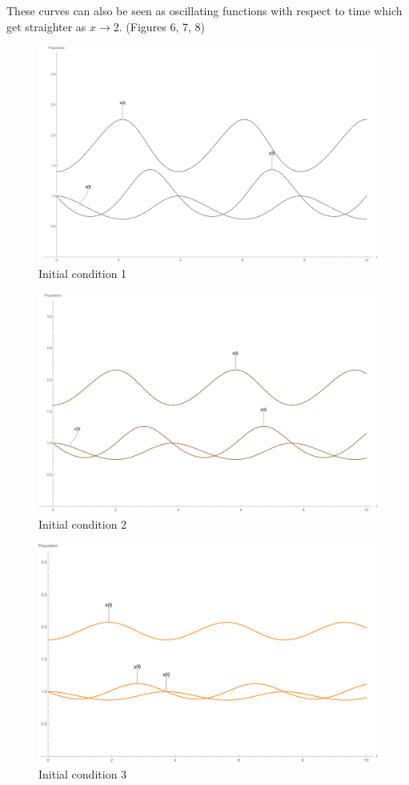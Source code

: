 \documentclass[11pt,oneside]{article}
\begin{document}
	These curves can also be seen as oscillating functions with respect to time which get straighter as $x \rightarrow 2$. (Figures 6, 7, 8)
	\begin{figure}[H]
		\center
		\includegraphics[scale=0.4]{par1}
		\caption{Initial condition 1}
	\end{figure}
	\begin{figure}[H]
		\center
		\includegraphics[scale=0.42]{par2}
		\caption{Initial condition 2}
	\end{figure}
	\begin{figure}[H]
		\center
		\includegraphics[scale=0.46]{par3}
		\caption{Initial condition 3}
	\end{figure}
\end{document}
